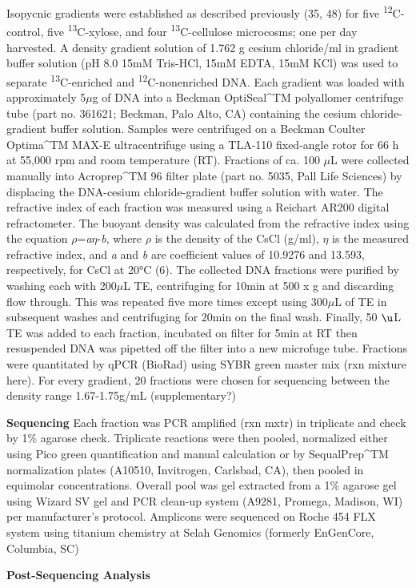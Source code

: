  Isopycnic gradients were established as described previously (35, 48) for five \textsuperscript{12}C-control, five \textsuperscript{13}C-xylose, and four \textsuperscript{13}C-cellulose microcosms; one per day harvested. A density gradient solution of 1.762 g cesium chloride/ml in gradient buffer solution (pH 8.0 15mM Tris-HCl, 15mM EDTA, 15mM KCl) was used to separate \textsuperscript{13}C-enriched and \textsuperscript{12}C-nonenriched DNA. Each gradient was loaded with approximately 5$\mu$g of DNA into a Beckman OptiSeal^{TM} polyallomer centrifuge tube (part no. 361621; Beckman, Palo Alto, CA) containing the cesium chloride-gradient buffer solution. Samples were centrifuged on a Beckman Coulter Optima^{TM} MAX-E ultracentrifuge using a TLA-110 fixed-angle rotor for 66 h at 55,000 rpm and room temperature (RT). Fractions of ca. 100 $\mu$L were collected manually into Acroprep^{TM} 96 filter plate (part no. 5035, Pall Life Sciences) by displacing the DNA-cesium chloride-gradient buffer solution with water. The refractive index of each fraction was measured using a Reichart AR200 digital refractometer. The buoyant density was calculated from the refractive index using the equation $\rho$=\textit{a}$\eta$-\textit{b}, where $\rho$ is the density of the CsCl (g/ml), $\eta$ is the measured refractive index, and \textit{a} and \textit{b} are coefficient values of 10.9276 and 13.593, respectively, for CsCl at 20°C (6).  The collected DNA fractions were purified by washing each with 200$\mu$L TE, centrifuging for 10min at 500 x g and discarding flow through.  This was repeated five more times except using 300$\mu$L of TE in subsequent washes and centrifuging for 20min on the final wash.  Finally, 50 $\u$L TE was added to each fraction, incubated on filter for 5min at RT then resuspended DNA was pipetted off the filter into a new microfuge tube.  Fractions were quantitated by qPCR (BioRad) using SYBR green master mix (rxn mixture here).  For every gradient, 20 fractions were chosen for sequencing between the density range 1.67-1.75g/mL (supplementary?)


\textbf{Sequencing}
Each fraction was PCR amplified (rxn mxtr) in triplicate and check by 1\% agarose check.  Triplicate reactions were then pooled, normalized either using Pico green quantification and manual calculation or by SequalPrep^{TM} normalization plates (A10510, Invitrogen, Carlsbad, CA), then pooled in equimolar concentrations.  Overall pool was gel extracted from a 1\% agarose gel using Wizard SV gel and PCR clean-up system (A9281, Promega, Madison, WI) per manufacturer's protocol.  Amplicons were sequenced on Roche 454 FLX system using titanium chemistry at Selah Genomics (formerly EnGenCore, Columbia, SC)    

\textbf{Post-Sequencing Analysis}
 